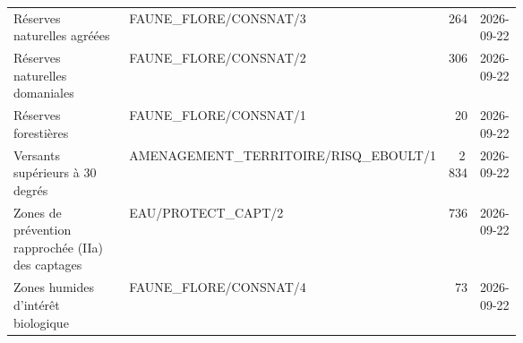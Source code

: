 \begin{tabular}{p{0.36\linewidth}p{0.30\linewidth}rl}
Réserves naturelles agréées & FAUNE\_FLORE/CONSNAT/3 & 264 & 2026-09-22 \\
Réserves naturelles domaniales & FAUNE\_FLORE/CONSNAT/2 & 306 & 2026-09-22 \\
Réserves forestières & FAUNE\_FLORE/CONSNAT/1 & 20 & 2026-09-22 \\
Versants supérieurs à 30 degrés & AMENAGEMENT\_TERRITOIRE/RISQ\_EBOULT/1 & 2\,834 & 2026-09-22 \\
Zones de prévention rapprochée (IIa) des captages & EAU/PROTECT\_CAPT/2 & 736 & 2026-09-22 \\
Zones humides d'intérêt biologique & FAUNE\_FLORE/CONSNAT/4 & 73 & 2026-09-22 \\
\bottomrule
\end{tabular}